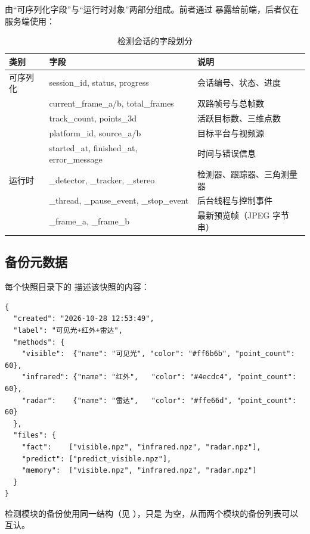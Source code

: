  由“可序列化字段”与“运行时对象”两部分组成。前者通过  暴露给前端，后者仅在服务端使用：

\begin{table}[H]
\centering
\caption{检测会话的字段划分}
\label{tab:session}
\small
\begin{tabularx}{\linewidth}{@{}>{\heiti}p{2.4cm}>{\ttfamily}p{6.0cm}>{\raggedright\arraybackslash}X@{}}
\toprule
类别 & 字段 & 说明 \\
\midrule
可序列化 & session\_id, status, progress & 会话编号、状态、进度 \\
 & current\_frame\_a/b, total\_frames & 双路帧号与总帧数 \\
 & track\_count, points\_3d & 活跃目标数、三维点数 \\
 & platform\_id, source\_a/b & 目标平台与视频源 \\
 & started\_at, finished\_at, error\_message & 时间与错误信息 \\
\midrule
运行时 & \_detector, \_tracker, \_stereo & 检测器、跟踪器、三角测量器 \\
 & \_thread, \_pause\_event, \_stop\_event & 后台线程与控制事件 \\
 & \_frame\_a, \_frame\_b & 最新预览帧（JPEG 字节串） \\
\bottomrule
\end{tabularx}
\end{table}

\subsection{备份元数据}

每个快照目录下的  描述该快照的内容：

\begin{lstlisting}[style=json, caption={备份清单 manifest.json 示例}]
{
  "created": "2026-10-28 12:53:49",
  "label": "可见光+红外+雷达",
  "methods": {
    "visible":  {"name": "可见光", "color": "#ff6b6b", "point_count": 60},
    "infrared": {"name": "红外",   "color": "#4ecdc4", "point_count": 60},
    "radar":    {"name": "雷达",   "color": "#ffe66d", "point_count": 60}
  },
  "files": {
    "fact":    ["visible.npz", "infrared.npz", "radar.npz"],
    "predict": ["predict_visible.npz"],
    "memory":  ["visible.npz", "infrared.npz", "radar.npz"]
  }
}
\end{lstlisting}

检测模块的备份使用同一结构（见 ），只是  为空，从而两个模块的备份列表可以互认。

